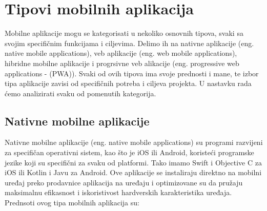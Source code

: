 \documentclass[12pt,oneside]{memoir}
\begin{document}
\section{Tipovi mobilnih aplikacija}

Mobilne aplikacije mogu se kategorisati u nekoliko osnovnih tipova, svaki sa svojim specifičnim funkcijama i ciljevima. Delimo ih na nativne aplikacije (eng. native mobile applications), veb aplikacije (eng. web mobile applications), hibridne mobilne aplikacije i progrsivne veb alikacije (eng. progressive web applications - (PWA)). Svaki od ovih tipova ima svoje prednosti i mane, te izbor tipa aplikacije zavisi od specifičnih potreba i ciljeva projekta. U nastavku rada ćemo analizirati svaku od pomenutih kategorija.

\subsection{Nativne mobilne aplikacije}

Nativne mobilne aplikacije\cite{nativeMobileApps} (eng. native mobile applications) su programi razvijeni za specifičan operativni sistem, kao što je iOS\cite{iosDocs} ili Android\cite{androidDocs}, koristeći programske jezike koji su specifični za svaku od platformi. Tako imamo Swift i Objective C za iOS ili Kotlin i Javu za Android. Ove aplikacije se instaliraju direktno na mobilni uređaj preko prodavnice aplikacija na uređaju i optimizovane su da pružaju maksimalnu efikasnost i iskoristivost hardverskih karakteristika uređaja. Prednsoti ovog tipa mobilnih aplikacija su:
\end{document}
